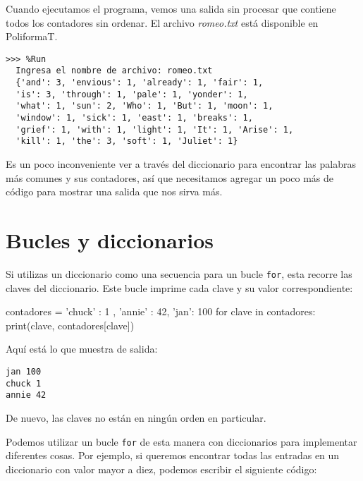 Cuando ejecutamos el programa, vemos una salida sin procesar que
contiene todos los contadores sin ordenar. El archivo \emph{romeo.txt}
está disponible en PoliformaT.

\begin{Verbatim}[frame=single]
>>> %Run
  Ingresa el nombre de archivo: romeo.txt
  {'and': 3, 'envious': 1, 'already': 1, 'fair': 1,
  'is': 3, 'through': 1, 'pale': 1, 'yonder': 1,
  'what': 1, 'sun': 2, 'Who': 1, 'But': 1, 'moon': 1,
  'window': 1, 'sick': 1, 'east': 1, 'breaks': 1,
  'grief': 1, 'with': 1, 'light': 1, 'It': 1, 'Arise': 1,
  'kill': 1, 'the': 3, 'soft': 1, 'Juliet': 1}
\end{Verbatim}

Es un poco inconveniente ver a través del diccionario para encontrar las
palabras más comunes y sus contadores, así que necesitamos agregar un
poco más de código para mostrar una salida que nos sirva más.

\hypertarget{bucles-y-diccionarios}{%
\section{Bucles y diccionarios}\label{bucles-y-diccionarios}}

 

Si utilizas un diccionario como una secuencia para un bucle
\texttt{for}, esta recorre las claves del diccionario. Este bucle
imprime cada clave y su valor correspondiente:


\begin{python}[frame=single]
contadores = { 'chuck' : 1 , 'annie' : 42, 'jan': 100}
for clave in contadores:
    print(clave, contadores[clave])
\end{python}


Aquí está lo que muestra de salida:

\begin{Verbatim}[frame=single]
jan 100
chuck 1
annie 42
\end{Verbatim}

De nuevo, las claves no están en ningún orden en particular.


Podemos utilizar un bucle \texttt{for} de esta manera con diccionarios para implementar diferentes cosas. Por ejemplo, si queremos encontrar todas
las entradas en un diccionario con valor mayor a diez, podemos escribir
el siguiente código:


